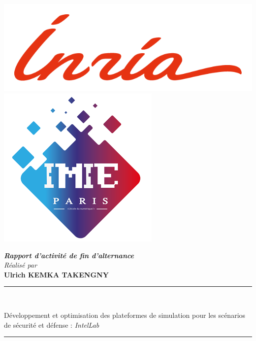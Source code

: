 \documentclass[a4paper, oneside, 12pt, final]{extreport}
\title{\reportSubject}
\author{\reportAuthor}
\newcommand{\reportAuthor} {
  \textbf{Ulrich KEMKA TAKENGNY}
}
\newcommand{\reportSubject} {
  Développement et optimisation des plateformes de simulation pour les scénarios de sécurité et défense : \textit{IntelLab} 
}
\begin{document}
\thispagestyle{empty}
\begin{titlepage}
  \begin{center}

    \includegraphics[scale=0.7]{./images/inr_logo_rouge.png}
    \hfill
    \includegraphics[scale=0.4]{./images/logonoir.png}

    \vspace{3cm}


    \textbf{\textit{Rapport d'activité de fin d'alternance}}\\

    \vspace{5pt}
    {\textit{Réalisé par}}\\
    \vspace{10pt} {
      \fontsize{14pt}{14pt}\selectfont
      {\bfseries\Large\sc \reportAuthor}\\
    }

    \vspace{15pt}

    {
      \renewcommand*{\familydefault}{\defaultFont}
      \fontsize{27pt}{27pt}\selectfont%
      \rule{0.5\textwidth}{.4pt}\\
      \vspace{10pt}
      \reportSubject{}\\%
      \vspace{10pt}
      \rule{0.5\textwidth}{.4pt}
    }


\end{center}
\end{titlepage}
\end{document}
